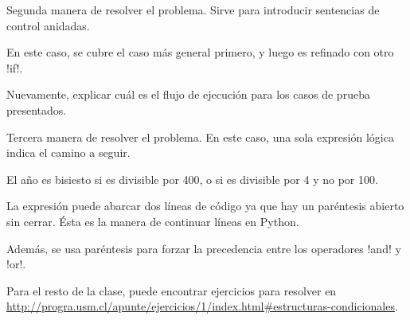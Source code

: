 \documentclass[10pt]{article}
\begin{document}
  Segunda manera de resolver el problema.
  Sirve para introducir sentencias de control anidadas.

  En este caso, se cubre el caso más general primero,
  y luego es refinado con otro \li!if!.

  Nuevamente, explicar cuál es el flujo de ejecución
  para los casos de prueba presentados.


  Tercera manera de resolver el problema.
  En este caso, una sola expresión lógica indica el camino a seguir.
  
  El año es bisiesto si es divisible por 400, o si es divisible por 4 y no por 100.

  La expresión puede abarcar dos líneas de código
  ya que hay un paréntesis abierto sin cerrar.
  Ésta es la manera de continuar líneas en Python.

  Además, se usa paréntesis para forzar la precedencia entre los operadores \li!and! y \li!or!.

  Para el resto de la clase,
  puede encontrar ejercicios para resolver en
  \url{http://progra.usm.cl/apunte/ejercicios/1/index.html#estructuras-condicionales}.
\end{document}
